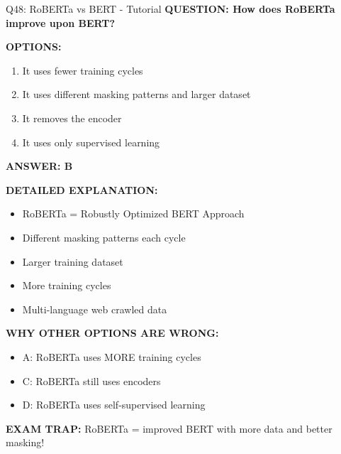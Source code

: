 \documentclass[8pt]{beamer}
\begin{document}
	\begin{frame}{Q48: RoBERTa vs BERT - Tutorial}
		\fontsize{6.5}{7.5}\selectfont
		\textbf{QUESTION: How does RoBERTa improve upon BERT?}
		
		\vspace{0.1cm}
		\textbf{OPTIONS:}
		\begin{enumerate}
			\item It uses fewer training cycles
			\item It uses different masking patterns and larger dataset
			\item It removes the encoder
			\item It uses only supervised learning
		\end{enumerate}
		
		\vspace{0.1cm}
		\textcolor{myblue}{\textbf{ANSWER: B}}
		
		\vspace{0.1cm}
		\textbf{DETAILED EXPLANATION:}
		\begin{itemize}
			\item RoBERTa = Robustly Optimized BERT Approach
			\item Different masking patterns each cycle
			\item Larger training dataset
			\item More training cycles
			\item Multi-language web crawled data
		\end{itemize}
		
		\vspace{0.1cm}
		\textcolor{myred}{\textbf{WHY OTHER OPTIONS ARE WRONG:}}
		\begin{itemize}
			\item \textcolor{myred}{A:} RoBERTa uses MORE training cycles
			\item \textcolor{myred}{C:} RoBERTa still uses encoders
			\item \textcolor{myred}{D:} RoBERTa uses self-supervised learning
		\end{itemize}
		
		\textcolor{myred}{\textbf{EXAM TRAP:}} RoBERTa = \textcolor{myblue}{improved BERT} with more data and better masking!
	\end{frame}
	
\end{document}
